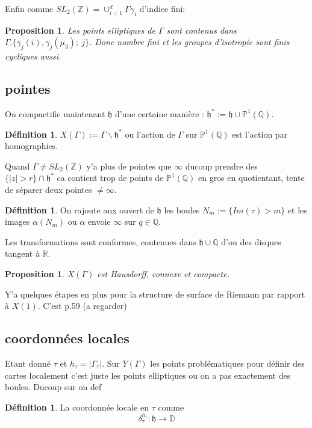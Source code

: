 \documentclass[12pt]{article}
\theoremstyle{plain}
\newtheorem{prop}[subsubsection]{Proposition}
\theoremstyle{definition}
\newtheorem{defn}[subsubsection]{D\'efinition}
\theoremstyle{remark}
\newcommand{\Z}{\mathbb{Z}}
\newcommand{\Q}{\mathbb{Q}}
\newcommand{\Proj}{\mathbb{P}}
\newcommand{\h}{\mathfrak{h}}
\begin{document}
Enfin comme $SL_2(\Z)=\cup_{i=1}^{d}\Gamma\gamma_i$ d'indice fini:
\begin{prop}
    Les points elliptiques de $\Gamma$ sont contenus dans $\Gamma.\{\gamma_j(i),\gamma_j(\mu_3);~j\}$. Donc nombre fini
    et les groupes d'isotropie sont finis cycliques aussi.
\end{prop}

\subsection{pointes}
On compactifie maintenant $\h$ d'une certaine manière : $\h^*:=\h\cup\Proj^1(\Q)$. 
\begin{defn}
    $X(\Gamma):=\Gamma\backslash \h^*$ ou l'action de $\Gamma$ sur $\Proj^1(\Q)$ est l'action par homographies.
\end{defn}

Quand $\Gamma\ne SL_2(\Z)$ y'a plus de pointes que $\infty$ ducoup prendre des $\{\lvert z\rvert > r\}\cap \h^*$ 
ca contient trop de points de $\Proj^1(\Q)$ en gros en quotientant, tente de séparer deux pointes $\ne\infty$.

\begin{defn}
    On rajoute aux ouvert de $\h$ les boules $N_m:=\{Im(\tau)> m\}$ et les images $\alpha(N_m)$ ou 
    $\alpha$ envoie $\infty$ sur $q\in\Q$.
\end{defn}
Les transformations sont conformes, contenues dans $\h\cup\Q$ d'ou des disques tangent à $\mathbb{R}$.


\begin{prop}
    $X(\Gamma)$ est Hausdorff, connexe et compacte.
\end{prop}

Y'a quelques étapes en plus pour la structure de surface de Riemann par rapport à $X(1)$. C'est p.59 (a regarder)

\subsection{coordonnées locales}
Etant donné $\tau$ et $h_{\tau}=\lvert\Gamma_{\tau}\rvert$.
Sur $Y(\Gamma)$ les points problématiques pour définir
des cartes localement c'est juste les points elliptiques 
ou on a pas exactement des boules. Ducoup sur on def

\begin{defn}
    La coordonnée locale en $\tau$ comme
     $$\delta_{\tau}^{h_{\tau}}:\h\rightarrow \mathbb{D}$$
\end{defn}
\end{document}
